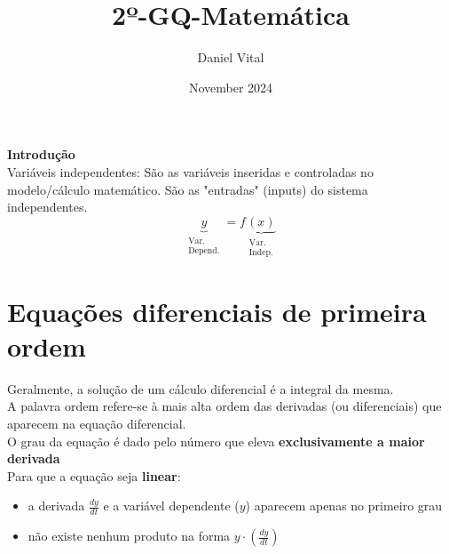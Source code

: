 \documentclass{article}
\title{2º-GQ-Matemática}
\author{Daniel Vital}
\date{November 2024}
\begin{document}
\maketitle

\textbf{Introdução}\\

Variáveis independentes: São as variáveis inseridas e controladas no modelo/cálculo matemático. São as "entradas" (inputs) do sistema\\

 independentes.\\

\[
\underbrace{y}_{\substack{\text{Var.}\\\text{Depend.}}}=f\underbrace{(x)}_{\substack{\text{Var.}\\\text{Indep.}}}
\]

\section{Equações diferenciais de primeira ordem}
Geralmente, a solução de um cálculo diferencial é a integral da mesma.\\
A palavra ordem refere-se à mais alta ordem das derivadas  (ou diferenciais) que aparecem na equação diferencial.\\
O grau da equação é dado pelo número que eleva \textbf{exclusivamente a maior derivada}\\
Para que a equação seja \textbf{linear}:
\begin{itemize}
    \item a derivada $\frac{dy}{dt}$ e a variável dependente ($y$) aparecem apenas no primeiro grau
    \item não existe nenhum produto na forma $y\cdot \left( \frac{dy}{dt} \right)$
\end{itemize}
\end{document}
